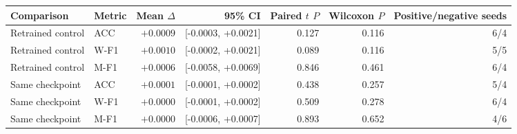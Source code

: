 \begin{tabular}{llrrrrr}
\toprule
Comparison & Metric & Mean $\Delta$ & 95\% CI & Paired $t$ $P$ & Wilcoxon $P$ & Positive/negative seeds \\
\midrule
Retrained control & ACC & $+0.0009$ & [-0.0003, +0.0021] & 0.127 & 0.116 & 6/4 \\
Retrained control & W-F1 & $+0.0010$ & [-0.0002, +0.0021] & 0.089 & 0.116 & 5/5 \\
Retrained control & M-F1 & $+0.0006$ & [-0.0058, +0.0069] & 0.846 & 0.461 & 6/4 \\
\addlinespace
Same checkpoint & ACC & $+0.0001$ & [-0.0001, +0.0002] & 0.438 & 0.257 & 5/4 \\
Same checkpoint & W-F1 & $+0.0000$ & [-0.0001, +0.0002] & 0.509 & 0.278 & 6/4 \\
Same checkpoint & M-F1 & $+0.0000$ & [-0.0006, +0.0007] & 0.893 & 0.652 & 4/6 \\
\bottomrule
\end{tabular}
